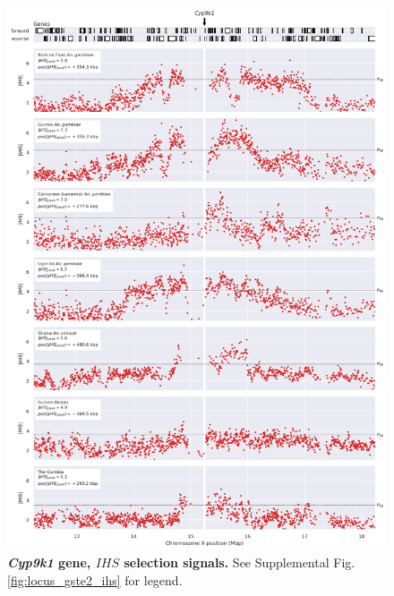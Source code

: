 \documentclass[a4paper,11pt,abstracton,hidelinks]{scrartcl}
\begin{document}
\begin{figure}[t!]
	\begin{center}
		\includegraphics*[width=1\linewidth,center]{artwork/locus_cyp9k1_ihs_pdist.png}
	\end{center}
	\caption[\textit{Cyp9k1} gene, $IHS$ selection signals]{
	\textbf{\textit{Cyp9k1} gene, $IHS$ selection signals.}
	See Supplemental Fig. \ref{fig:locus_gste2_ihs} for legend.
	} 
	\label{fig:locus_cyp9k1_ihs}
\end{figure}


\clearpage
\end{document}
